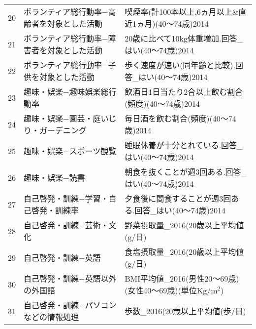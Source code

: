 \begin{table}[ht]
\begin{adjustbox}{width=1\textwidth}
\begin{tabular}{rll}
  20 & ボランティア総行動率−高齢者を対象とした活動 & 喫煙率(計100本以上,6ヵ月以上\&直近1ヵ月)(40〜74歳)2014 \\
  21 & ボランティア総行動率−障害者を対象とした活動 & 20歳に比べて10kg体重増加.回答\_はい(40〜74歳)2014 \\
  22 & ボランティア総行動率−子供を対象とした活動 & 歩く速度が速い(同年齢と比較).回答\_はい(40〜74歳)2014 \\
  23 & 趣味・娯楽−趣味娯楽総行動率 & 飲酒日1日当たり2合以上飲む割合(頻度)(40〜74歳)2014 \\
  24 & 趣味・娯楽−園芸・庭いじり・ガーデニング & 毎日酒を飲む割合(頻度)(40〜74歳)2014 \\
  25 & 趣味・娯楽−スポーツ観覧 & 睡眠休養が十分とれている.回答\_はい(40〜74歳)2014 \\
  26 & 趣味・娯楽−読書 & 朝食を抜くことが週3回ある.回答\_はい(40〜74歳)2014 \\
  27 & 自己啓発・訓練−学習・自己啓発・訓練率 & 夕食後に間食することが週3回ある.回答\_はい(40〜74歳)2014 \\
  28 & 自己啓発・訓練−芸術・文化 & 野菜摂取量\_2016(20歳以上平均値(g/日) \\
  29 & 自己啓発・訓練−英語 & 食塩摂取量\_2016(20歳以上平均値(g/日) \\
  30 & 自己啓発・訓練−英語以外の外国語 & BMI平均値\_2016(男性20〜69歳)(女性40〜69歳)(単位Kg/m$^2$) \\
  31 & 自己啓発・訓練−パソコンなどの情報処理 & 歩数\_2016(20歳以上平均値(歩/日) \\
   \hline
\end{tabular}
\end{adjustbox}

\endgroup
\end{table}
